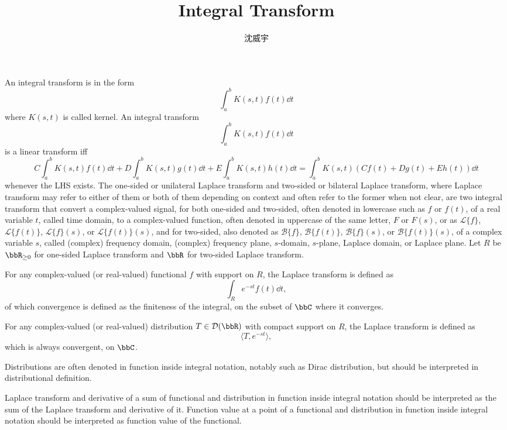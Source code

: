 \documentclass[a4paper,12pt]{article}
\begin{document}
\title{Integral Transform}
\author{沈威宇}
\date{\temtoday}
\titletocdoc
{}
An integral transform is in the form
\[\int_a^b K(s,t)f(t)\dd{t}\]
where $K(s,t)$ is called kernel.
An integral transform
\[\int_a^b K(s,t)f(t)\dd{t}\]
is a linear transform iff
\[C\int_a^bK(s,t)f(t)\dd{t}+D\int_a^bK(s,t)g(t)\dd{t}+E\int_a^bK(s,t)h(t)\dd{t}=\int_a^bK(s,t)(Cf(t)+Dg(t)+Eh(t))\dd{t}\]
whenever the LHS exists.
The one-sided or unilateral Laplace transform and two-sided or bilateral Laplace transform, where Laplace transform may refer to either of them or both of them depending on context and often refer to the former when not clear, are two integral transform that convert a complex-valued signal, for both one-sided and two-sided, often denoted in lowercase such as $f$ or $f(t)$, of a real variable $t$, called time domain, to a complex-valued function, often denoted in uppercase of the same letter, $F$ or $F(s)$, or as $\mathcal{L}\{f\}$, $\mathcal{L}\{f(t)\}$, $\mathcal{L}\{f\}(s)$, or $\mathcal{L}\{f(t)\}(s)$, and for two-sided, also denoted as $\mathcal{B}\{f\}$, $\mathcal{B}\{f(t)\}$, $\mathcal{B}\{f\}(s)$, or $\mathcal{B}\{f(t)\}(s)$, of a complex variable $s$, called (complex) frequency domain, (complex) frequency plane, $s$-domain, $s$-plane, Laplace domain, or Laplace plane.
Let $R$ be $\bbR_{\geq0}$ for one-sided Laplace transform and $\bbR$ for two-sided Laplace transform.

For any complex-valued (or real-valued) functional $f$ with support on $R$, the Laplace transform is defined as
\[\int_Re^{-st}f(t)\dd{t},\]
of which convergence is defined as the finiteness of the integral, on the subset of $\bbC$ where it converges.

For any complex-valued (or real-valued) distribution $T\in\mathcal{D}(\bbR)$ with compact support on $R$, the Laplace transform is defined as
\[\langle T,e^{-st}\rangle,\]
which is always convergent, on $\bbC$.

Distributions are often denoted in function inside integral notation, notably such as Dirac distribution, but should be interpreted in distributional definition.

Laplace transform and derivative of a sum of functional and distribution in function inside integral notation should be interpreted as the sum of the Laplace transform and derivative of it. Function value at a point of a functional and distribution in function inside integral notation should be interpreted as function value of the functional.
\end{document}

